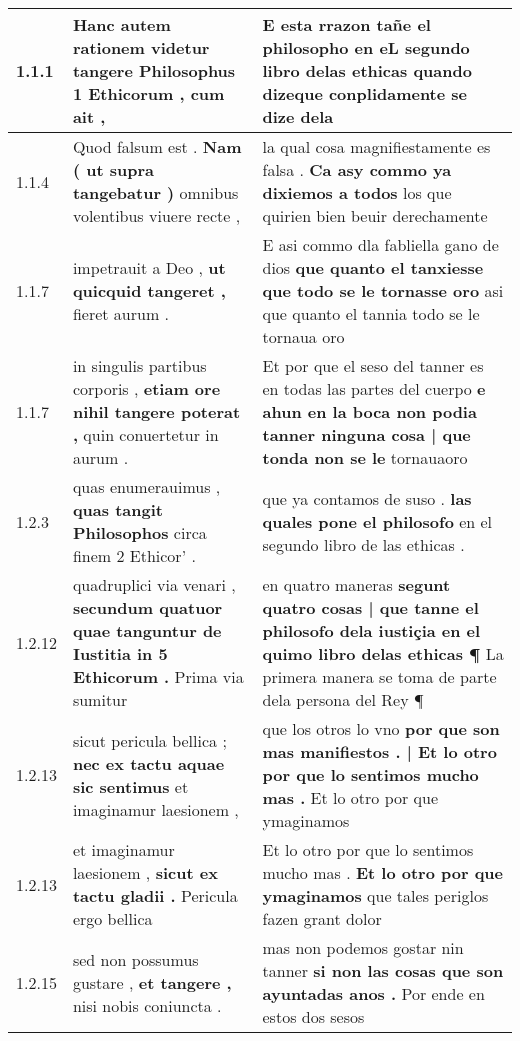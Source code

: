 \begin{tabular}{|p{1cm}|p{6.5cm}|p{6.5cm}|}

\hline
1.1.1 & Hanc autem rationem videtur \textbf{ tangere Philosophus 1 Ethicorum , } cum ait , & E esta rrazon tañe el philosopho en \textbf{ eL segundo libro delas ethicas quando } dizeque conplidamente se dize dela \\\hline
1.1.4 & Quod falsum est . \textbf{ Nam ( ut supra tangebatur ) } omnibus volentibus viuere recte , & la qual cosa magnifiestamente es falsa . \textbf{ Ca asy commo ya dixiemos a todos } los que quirien bien beuir derechamente \\\hline
1.1.7 & impetrauit a Deo , \textbf{ ut quicquid tangeret , } fieret aurum . & E asi commo dla fabliella gano de dios \textbf{ que quanto el tanxiesse que todo se le tornasse oro } asi que quanto el tannia todo se le tornaua oro \\\hline
1.1.7 & in singulis partibus corporis , \textbf{ etiam ore nihil tangere poterat , } quin conuertetur in aurum . & Et por que el seso del tanner es en todas las partes del cuerpo \textbf{ e ahun en la boca non podia tanner ninguna cosa | que tonda non se le } tornauaoro \\\hline
1.2.3 & quas enumerauimus , \textbf{ quas tangit Philosophos } circa finem 2 Ethicor’ . & que ya contamos de suso . \textbf{ las quales pone el philosofo } en el segundo libro de las ethicas . \\\hline
1.2.12 & quadruplici via venari , \textbf{ secundum quatuor quae tanguntur de Iustitia in 5 Ethicorum . } Prima via sumitur & en quatro maneras \textbf{ segunt quatro cosas | que tanne el philosofo dela iustiçia en el quimo libro delas ethicas ¶ } La primera manera se toma de parte dela persona del Rey ¶ \\\hline
1.2.13 & sicut pericula bellica ; \textbf{ nec ex tactu aquae sic sentimus } et imaginamur laesionem , & que los otros lo vno \textbf{ por que son mas manifiestos . | Et lo otro por que lo sentimos mucho mas . } Et lo otro por que ymaginamos \\\hline
1.2.13 & et imaginamur laesionem , \textbf{ sicut ex tactu gladii . } Pericula ergo bellica & Et lo otro por que lo sentimos mucho mas . \textbf{ Et lo otro por que ymaginamos } que tales periglos fazen grant dolor \\\hline
1.2.15 & sed non possumus gustare , \textbf{ et tangere , } nisi nobis coniuncta . & mas non podemos gostar nin tanner \textbf{ si non las cosas que son ayuntadas anos . } Por ende en estos dos sesos \\\hline

\end{tabular}
